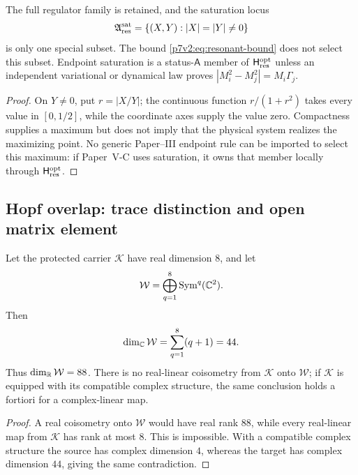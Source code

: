 \documentclass[11pt,a4paper]{article}
\newcommand{\Hresopt}{\mathsf H_{\rm res}^{\rm opt}}
\begin{document}
\begin{corollary}
\label{p7v2:cor:no-resonance-selector}
The full regulator family is retained, and the saturation locus
\begin{equation}
\label{p7v2:eq:resonance-saturation-locus}
 \mathfrak A_{\rm res}^{\rm sat}
 =\{(X,Y):|X|=|Y|\neq0\}
\end{equation}
is only one special subset.  The bound
\eqref{p7v2:eq:resonant-bound} does not select this subset.  Endpoint
saturation is a status-\(\mathsf A\) member of \(\Hresopt\) unless an independent
variational or dynamical law proves
\(|M_i^2-M_j^2|=M_i\Gamma_j\).
\end{corollary}

\begin{proof}
On \(Y\ne0\), put \(r=|X/Y|\); the continuous function
\(r/(1+r^2)\) takes every value in \([0,1/2]\), while the coordinate axes
supply the value zero.  Compactness supplies a
maximum but does not imply that the physical system realizes the maximizing
point.  No generic Paper--III endpoint rule can be imported to select this
maximum: if Paper~V-C uses saturation, it owns that member locally through
\(\Hresopt\).
\end{proof}

\subsection{Hopf overlap: trace distinction and open matrix element}
\label{p7v2:sec:hopf-overlap}

\begin{theorem}
\label{p7v2:thm:hopf-coisometry-no-go}
Let the protected carrier \(\mathcal K\) have real dimension \(8\), and let
\[
 \mathcal W
 =
 \bigoplus_{q=1}^{8}\operatorname{Sym}^q(\mathbb{C}^2).
\]
Then
\begin{equation}
\label{p7v2:eq:hopf-dimensions}
 \dim_{\mathbb{C}}\mathcal W
 =
 \sum_{q=1}^{8}(q+1)
 =44.
\end{equation}
Thus \(\dim_{\mathbb{R}}\mathcal W=88\).  There is no real-linear coisometry from
\(\mathcal K\) onto \(\mathcal W\); if \(\mathcal K\) is equipped with its
compatible complex structure, the same conclusion holds a fortiori for a
complex-linear map.
\end{theorem}

\begin{proof}
A real coisometry onto \(\mathcal W\) would have real rank \(88\), while every
real-linear map from \(\mathcal K\) has rank at most \(8\).  This is
impossible.  With a compatible complex structure the source has complex
dimension \(4\), whereas the target has complex dimension \(44\), giving the
same contradiction.
\end{proof}
\end{document}
